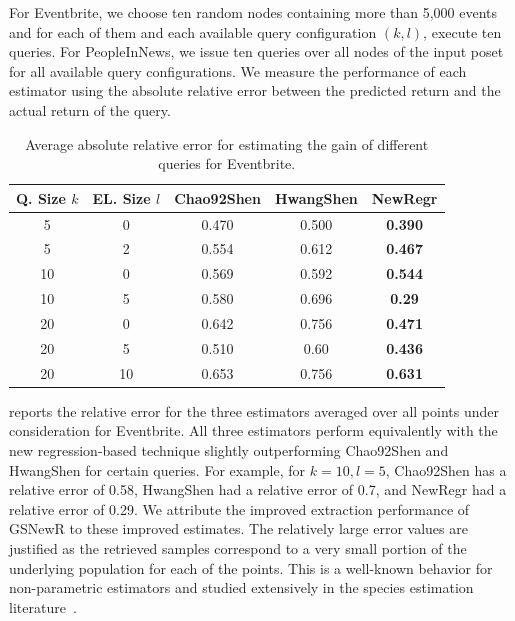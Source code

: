 For Eventbrite, we choose ten random nodes containing more than 5,000 events and for each of them and each available query configuration $(k,l)$, execute ten queries. For PeopleInNews, we issue ten queries over all nodes of the input poset for all available query configurations.  We measure the performance of each estimator using the absolute relative error between the predicted return and the actual return of the query.

\begin{table}
\scriptsize
\center
\caption{Average absolute relative error for estimating the gain of different queries for Eventbrite.}
\vspace{-10pt}

\label{tab:eventesterror}
\begin{tabular}{|c|c|c|c|c|}
\hline
\textbf{Q. Size $k$} & \textbf{EL. Size $l$} & \textbf{Chao92Shen} & \textbf{HwangShen} & \textbf{NewRegr} \\ \hline
5 & 0 & 0.470 & 0.500 & {\bf 0.390} \\
5 & 2 & 0.554 & 0.612 & {\bf 0.467}\\
10 & 0 & 0.569 & 0.592 & {\bf 0.544}\\
10 & 5 & 0.580 & 0.696 & {\bf 0.29}\\
20 & 0 & 0.642 & 0.756 & {\bf 0.471}\\
20 & 5 & 0.510 & 0.60 & {\bf 0.436} \\
20 & 10 & 0.653 & 0.756 & {\bf 0.631}\\
\hline
\end{tabular}
\end{table}

 reports the relative error for the three estimators averaged over all points under consideration for Eventbrite. All three estimators perform equivalently with the new regression-based technique slightly outperforming Chao92Shen and HwangShen for certain queries. For example, for $k = 10, l = 5$, Chao92Shen has a relative error of 0.58, HwangShen had a relative error of 0.7, and NewRegr had a relative error of 0.29. 
We attribute the improved extraction performance of GSNewR to these improved estimates. The relatively large error values are justified as the retrieved samples correspond to a very small portion of the underlying population for each of the points. This is a well-known behavior for non-parametric estimators and studied extensively in the species estimation literature~\cite{hwang:2010}.

